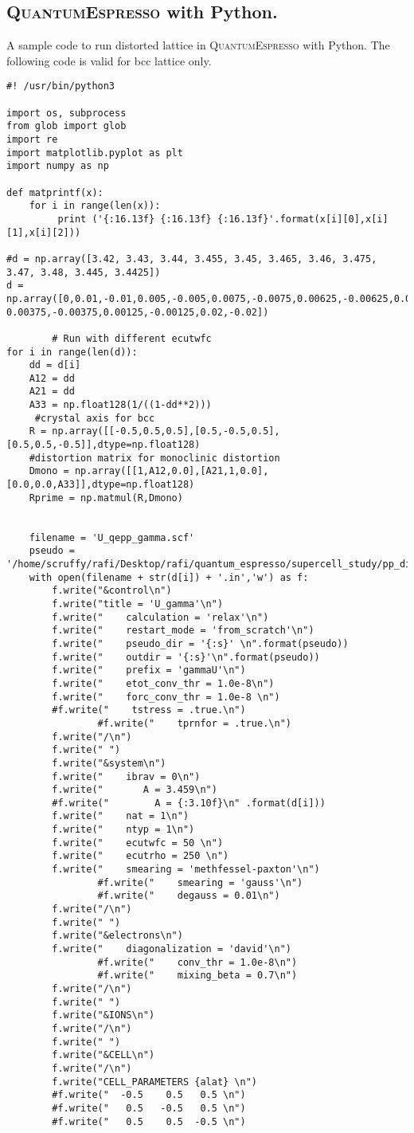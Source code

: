 \subsection{\mbox{\textsc{QuantumEspresso}} with Python.}
A sample code to run distorted lattice in \mbox{\textsc{QuantumEspresso}} with Python.
The following code is valid for bcc lattice only.
\lstset{style=pythn}
\begin{lstlisting}
#! /usr/bin/python3

import os, subprocess
from glob import glob
import re
import matplotlib.pyplot as plt 
import numpy as np

def matprintf(x):
    for i in range(len(x)):
         print ('{:16.13f} {:16.13f} {:16.13f}'.format(x[i][0],x[i][1],x[i][2]))

#d = np.array([3.42, 3.43, 3.44, 3.455, 3.45, 3.465, 3.46, 3.475, 3.47, 3.48, 3.445, 3.4425])
d = np.array([0,0.01,-0.01,0.005,-0.005,0.0075,-0.0075,0.00625,-0.00625,0.0025,-0.0025,\
0.00375,-0.00375,0.00125,-0.00125,0.02,-0.02])
    
        # Run with different ecutwfc
for i in range(len(d)):
    dd = d[i]
    A12 = dd
    A21 = dd
    A33 = np.float128(1/((1-dd**2)))
     #crystal axis for bcc
    R = np.array([[-0.5,0.5,0.5],[0.5,-0.5,0.5],[0.5,0.5,-0.5]],dtype=np.float128)
    #distortion matrix for monoclinic distortion
    Dmono = np.array([[1,A12,0.0],[A21,1,0.0],[0.0,0.0,A33]],dtype=np.float128)
    Rprime = np.matmul(R,Dmono)


    filename = 'U_qepp_gamma.scf' 
    pseudo = '/home/scruffy/rafi/Desktop/rafi/quantum_espresso/supercell_study/pp_dir'
    with open(filename + str(d[i]) + '.in','w') as f:
        f.write("&control\n")
        f.write("title = 'U_gamma'\n")
        f.write("    calculation = 'relax'\n")
        f.write("    restart_mode = 'from_scratch'\n")
        f.write("    pseudo_dir = '{:s}' \n".format(pseudo))
        f.write("    outdir = '{:s}'\n".format(pseudo))
        f.write("    prefix = 'gammaU'\n")
        f.write("    etot_conv_thr = 1.0e-8\n")
        f.write("    forc_conv_thr = 1.0e-8 \n")
        #f.write("    tstress = .true.\n")
                #f.write("    tprnfor = .true.\n")
        f.write("/\n")
        f.write(" ")
        f.write("&system\n")
        f.write("    ibrav = 0\n")
        f.write("       A = 3.459\n")
        #f.write("        A = {:3.10f}\n" .format(d[i]))
        f.write("    nat = 1\n")
        f.write("    ntyp = 1\n")
        f.write("    ecutwfc = 50 \n")
        f.write("    ecutrho = 250 \n")
        f.write("    smearing = 'methfessel-paxton'\n")
                #f.write("    smearing = 'gauss'\n")
                #f.write("    degauss = 0.01\n")
        f.write("/\n")
        f.write(" ")
        f.write("&electrons\n")
        f.write("    diagonalization = 'david'\n")
                #f.write("    conv_thr = 1.0e-8\n")
                #f.write("    mixing_beta = 0.7\n")
        f.write("/\n")
        f.write(" ")
        f.write("&IONS\n")
        f.write("/\n")
        f.write(" ")
        f.write("&CELL\n")
        f.write("/\n")
        f.write("CELL_PARAMETERS {alat} \n")
        #f.write("  -0.5    0.5   0.5 \n")
        #f.write("   0.5   -0.5   0.5 \n")
        #f.write("   0.5    0.5  -0.5 \n")
    

\end{lstlisting}
